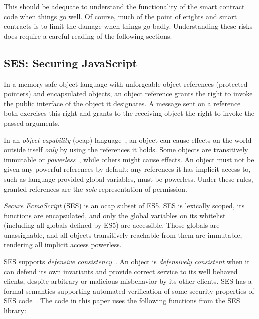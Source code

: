 \documentclass{llncs}
\begin{document}
This should be adequate to understand the functionality of the smart contract code when things go well. Of course, much of the point of erights and smart contracts is to limit the damage when things go badly. Understanding these risks does require a careful reading of the following sections.
 

\subsection{SES: Securing JavaScript}
\label{ses}

In a memory-safe object language with unforgeable object references (protected pointers) and encapsulated objects, an object reference grants the right to invoke the public interface of the object it designates. A message sent on a reference both exercises this right and grants to the receiving object the right to invoke the passed arguments. 

In an \emph{object-capability} (ocap) language~\cite{RobustComposition}, an object can cause effects on the world outside itself \emph{only} by using the references it holds. Some objects are transitively immutable or \emph{powerless}~\cite{Mettler:EECS-2012-244}, while others might cause effects. An object must not be given any powerful references by default; any references it has implicit access to, such as language-provided global variables, must be powerless. Under these rules, granted references are the \emph{sole} representation of permission.

\emph{Secure EcmaScript} (SES) is an ocap subset of ES5. SES is lexically scoped, its functions are encapsulated, and only the global variables on its whitelist (including all globals defined by ES5) are accessible. Those globals  are unassignable, and all objects transitively reachable from them are immutable, rendering all implicit access powerless. 

SES supports \emph{defensive consistency}~\cite{RobustComposition}. An object is \emph{defensively consistent} when it can defend its own invariants and provide correct service to its well behaved clients, despite arbitrary or malicious misbehavior by its other clients. SES has a formal semantics supporting automated verification of some security properties of SES code~\cite{taly2011automated}. The code in this paper uses the following functions from the SES library:
\end{document}
